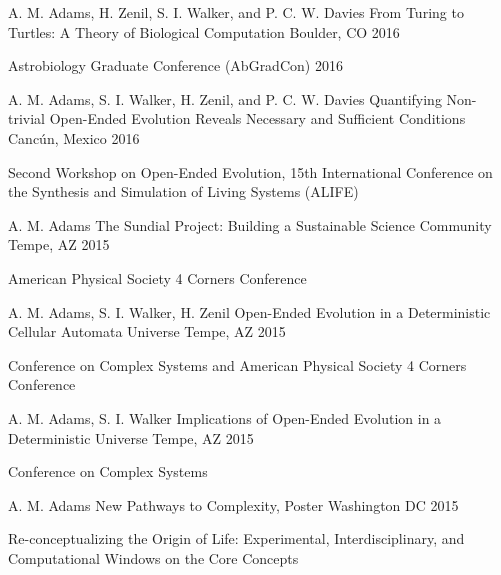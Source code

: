 \begin{cventries}
\cventry
    {\textcolor{cmyk-magenta}{A. M. Adams}, H. Zenil, S. I. Walker, and P. C. W. Davies}
    {From Turing to Turtles: A Theory of Biological Computation}
    {Boulder, CO}
    {2016}
    {
      \begin{cvitems}
        \item {Astrobiology Graduate Conference (AbGradCon) 2016}
      \end{cvitems}
    }
    
\cventry
    {\textcolor{cmyk-magenta}{A. M. Adams}, S. I. Walker, H. Zenil, and P. C. W. Davies}
    {Quantifying Non-trivial Open-Ended Evolution Reveals Necessary and Sufficient Conditions}
    {Canc\'{u}n, Mexico}
    {2016}
    {
      \begin{cvitems}
        \item {Second Workshop on Open-Ended Evolution, 15th International Conference on the Synthesis and Simulation of Living Systems (ALIFE)}
      \end{cvitems}
    }
    
\cventry
    {\textcolor{cmyk-magenta}{A. M. Adams}}
    {The Sundial Project: Building a Sustainable Science Community}
    {Tempe, AZ}
    {2015}
    {
      \begin{cvitems}
        \item {American Physical Society 4 Corners Conference}
      \end{cvitems}
    }
    
\cventry
    {\textcolor{cmyk-magenta}{A. M. Adams}, S. I. Walker, H. Zenil}
    {Open-Ended Evolution in a Deterministic Cellular Automata Universe}
    {Tempe, AZ}
    {2015}
    {
      \begin{cvitems}
        \item {Conference on Complex Systems and American Physical Society 4 Corners Conference}
      \end{cvitems}
    }
    
\cventry
    {\textcolor{cmyk-magenta}{A. M. Adams}, S. I. Walker}
    {Implications of Open-Ended Evolution in a Deterministic Universe}
    {Tempe, AZ}
    {2015}
    {
      \begin{cvitems}
        \item {Conference on Complex Systems}
      \end{cvitems}
    }
    
\cventry
    {\textcolor{cmyk-magenta}{A. M. Adams}}
    {New Pathways to Complexity, Poster}
    {Washington DC}
    {2015}
    {
      \begin{cvitems}
        \item {Re-conceptualizing the Origin of Life: Experimental, Interdisciplinary, and Computational Windows on the Core Concepts}
      \end{cvitems}
    }
    

\end{cventries}
